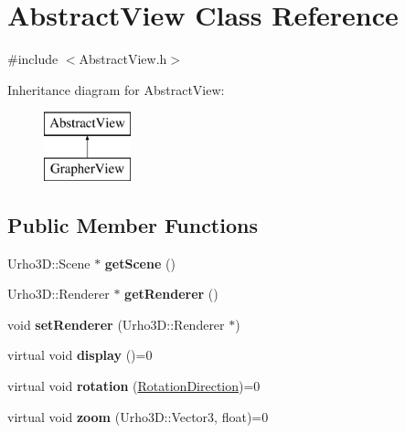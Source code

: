 \hypertarget{class_abstract_view}{}\section{Abstract\+View Class Reference}
\label{class_abstract_view}


{\ttfamily \#include $<$Abstract\+View.\+h$>$}

Inheritance diagram for Abstract\+View\+:\begin{figure}[H]
\begin{center}
\leavevmode
\includegraphics[height=2.000000cm]{class_abstract_view}
\end{center}
\end{figure}
\subsection*{Public Member Functions}
\begin{DoxyCompactItemize}
\item 
\mbox{\label{class_abstract_view_af7ebaad00de819ca6b360251941c2381}} 
Urho3\+D\+::\+Scene $\ast$ {\bfseries get\+Scene} ()
\item 
\mbox{\label{class_abstract_view_a9b387c81386479cba5d382370879113f}} 
Urho3\+D\+::\+Renderer $\ast$ {\bfseries get\+Renderer} ()
\item 
\mbox{\label{class_abstract_view_adb1b4fcdd5edd5ec42d486cda2c229e2}} 
void {\bfseries set\+Renderer} (Urho3\+D\+::\+Renderer $\ast$)
\item 
\mbox{\label{class_abstract_view_a8a9816e331cb905cc9cea053ba045f42}} 
virtual void {\bfseries display} ()=0
\item 
\mbox{\label{class_abstract_view_abc3460b17aa9b08a2d73bc134ec2fb62}} 
virtual void {\bfseries rotation} (\mbox{\hyperlink{class_rotation_direction}{Rotation\+Direction}})=0
\item 
\mbox{\label{class_abstract_view_a475e5d7e6ac6b95854ccedb5fafea025}} 
virtual void {\bfseries zoom} (Urho3\+D\+::\+Vector3, float)=0
\end{DoxyCompactItemize}
